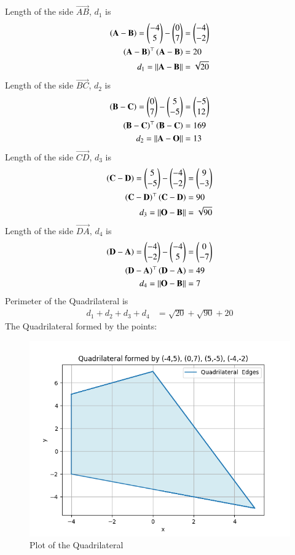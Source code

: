 \documentclass[journal]{IEEEtran}
\begin{document}
Length of the side $\vec{AB}$, $d_1$ is
\begin{align}
	\left(\mathbf{A} - \mathbf{B}\right) = \begin{pmatrix}-4\\5\end{pmatrix} - \begin{pmatrix}0\\7\end{pmatrix} &= \begin{pmatrix}-4\\-2\end{pmatrix}\\
	\left(\mathbf{A-B}\right)^\top\left(\mathbf{A-B}\right)&=20\\
    d_1=||\mathbf{A}-\mathbf{B}||&=\sqrt{20}
\end{align}
Length of the side $\vec{BC}$, $d_2$ is
\begin{align}
	\left(\mathbf{B} - \mathbf{C}\right) = \begin{pmatrix}0\\7\end{pmatrix} - \begin{pmatrix}5\\-5\end{pmatrix} &= \begin{pmatrix}-5\\12\end{pmatrix}\\
	\left(\mathbf{B-C}\right)^\top\left(\mathbf{B-C}\right)&=169\\
    d_2=||\mathbf{A}-\mathbf{O}||&=13
\end{align}
Length of the side $\vec{CD}$, $d_3$ is
\begin{align}
	\left(\mathbf{C} - \mathbf{D}\right) = \begin{pmatrix}5\\-5\end{pmatrix} - \begin{pmatrix}-4\\-2\end{pmatrix} &= \begin{pmatrix}9\\-3\end{pmatrix}\\
	\left(\mathbf{C-D}\right)^\top\left(\mathbf{C-D}\right)&=90\\
    d_3=||\mathbf{O}-\mathbf{B}||&=\sqrt{90}
\end{align}
Length of the side $\vec{DA}$, $d_4$ is
\begin{align}
	\left(\mathbf{D} - \mathbf{A}\right) = \begin{pmatrix}-4\\-2\end{pmatrix} - \begin{pmatrix}-4\\5\end{pmatrix} &= \begin{pmatrix}0\\-7\end{pmatrix}\\
	\left(\mathbf{D-A}\right)^\top\left(\mathbf{D-A}\right)&=49\\
    d_4=||\mathbf{O}-\mathbf{B}||&=7
\end{align}
Perimeter of the Quadrilateral is 
\begin{align}
    d_1+d_2+d_3+d_4&=\sqrt{20}+\sqrt{90}+20
\end{align}
The Quadrilateral formed by the points:
\begin{figure}[h!]
   \centering
   \includegraphics[width=0.7\linewidth]{figs/fig.png}
   \caption{Plot of the Quadrilateral}
   \label{stemplot}
\end{figure}  
\end{document}
